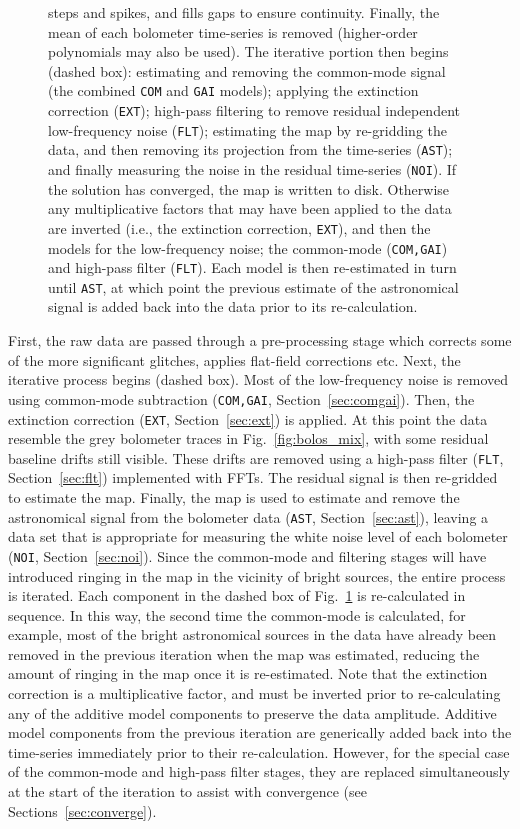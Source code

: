 \documentclass[useAMS,usenatbib,nofootinbib]{mn2e}
\newcommand{\model}[1]{\texttt{#1}}
\begin{document}
\begin{figure}
{  steps and spikes, and fills gaps to ensure continuity. Finally, the
  mean of each bolometer time-series is removed (higher-order
  polynomials may also be used). The iterative portion then begins
  (dashed box): estimating and removing the common-mode signal (the
  combined \model{COM} and \model{GAI} models); applying the
  extinction correction (\model{EXT}); high-pass filtering to remove
  residual independent low-frequency noise (\model{FLT}); estimating
  the map by re-gridding the data, and then removing its projection
  from the time-series (\model{AST}); and finally measuring the noise
  in the residual time-series (\model{NOI}). If the solution has
  converged, the map is written to disk. Otherwise any multiplicative
  factors that may have been applied to the data are inverted (i.e.,
  the extinction correction, \model{EXT}), and then the models for the
  low-frequency noise; the common-mode (\model{COM,GAI}) and high-pass
  filter (\model{FLT}). Each model is then re-estimated in turn until
  \model{AST}, at which point the previous estimate of the
  astronomical signal is added back into the data prior to its
  re-calculation.}
\label{fig:dimm}
\end{figure}

First, the raw data are passed through a pre-processing stage which
corrects some of the more significant glitches, applies flat-field
corrections etc. Next, the iterative process begins (dashed box). Most
of the low-frequency noise is removed using common-mode subtraction
(\model{COM,GAI}, Section~\ref{sec:comgai}). Then, the extinction
correction (\model{EXT}, Section~\ref{sec:ext}) is applied. At this
point the data resemble the grey bolometer traces in
Fig.~\ref{fig:bolos_mix}, with some residual baseline drifts still
visible. These drifts are removed using a high-pass filter
(\model{FLT}, Section~\ref{sec:flt}) implemented with FFTs. The
residual signal is then re-gridded to estimate the map. Finally, the
map is used to estimate and remove the astronomical signal from the
bolometer data (\model{AST}, Section~\ref{sec:ast}), leaving a data
set that is appropriate for measuring the white noise level of each
bolometer (\model{NOI}, Section~\ref{sec:noi}). Since the common-mode
and filtering stages will have introduced ringing in the map in the
vicinity of bright sources, the entire process is iterated. Each
component in the dashed box of Fig.~\ref{fig:dimm} is re-calculated in
sequence. In this way, the second time the common-mode is calculated,
for example, most of the bright astronomical sources in the data have
already been removed in the previous iteration when the map was
estimated, reducing the amount of ringing in the map once it is
re-estimated. Note that the extinction correction is a multiplicative
factor, and must be inverted prior to re-calculating any of the
additive model components to preserve the data amplitude. Additive
model components from the previous iteration are generically added
back into the time-series immediately prior to their
re-calculation. However, for the special case of the common-mode and
high-pass filter stages, they are replaced simultaneously at the start
of the iteration to assist with convergence (see
Sections~\ref{sec:converge}).
\end{document}
